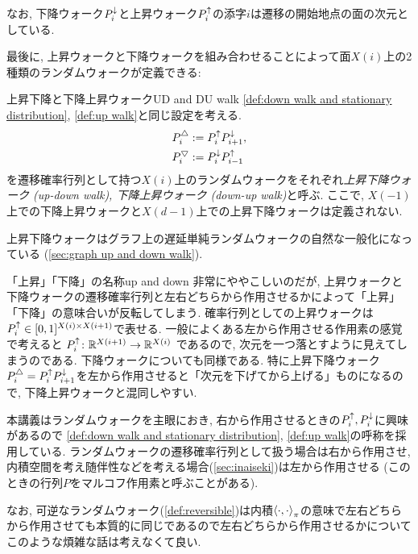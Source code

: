 なお, 下降ウォーク$P^{\downarrow}_{i}$と上昇ウォーク$P^{\uparrow}_i$の添字$i$は遷移の開始地点の面の次元としている.
%

最後に, 上昇ウォークと下降ウォークを組み合わせることによって面$X(i)$上の2種類のランダムウォークが定義できる:
\begin{definition}{上昇下降と下降上昇ウォーク}{UD and DU walk}
    \cref{def:down walk and stationary distribution}, \ref{def:up walk}と同じ設定を考える.
    \begin{align*}
        &P^{\triangle}_i \mathrel{:=}  P^{\uparrow}_i P^{\downarrow}_{i+1},\\
        &P^{\bigtriangledown}_i \mathrel{:=} P^{\downarrow}_{i}P^{\uparrow}_{i-1}
    \end{align*}
    を遷移確率行列として持つ$X(i)$上のランダムウォークをそれぞれ\emph{上昇下降ウォーク (up-down walk), 下降上昇ウォーク (down-up walk)}と呼ぶ.
    ここで, $X(-1)$上での下降上昇ウォークと$X(d-1)$上での上昇下降ウォークは定義されない.
\end{definition}
上昇下降ウォークはグラフ上の遅延単純ランダムウォークの自然な一般化になっている (\cref{sec:graph up and down walk}).

\begin{remark}{「上昇」「下降」の名称}{up and down}
    非常にややこしいのだが,
    上昇ウォークと下降ウォークの遷移確率行列と左右どちらから作用させるかによって「上昇」「下降」の意味合いが反転してしまう.
    確率行列としての上昇ウォークは$P^{\uparrow}_i \in [0,1]^{X(i)\times X(i+1)}$で表せる.
    一般によくある左から作用させる作用素の感覚で考えると
    $P^{\uparrow}_i\colon \mathbb{R}^{X(i+1)} \to \mathbb{R}^{X(i)}$
    であるので, 次元を一つ落とすように見えてしまうのである.
    下降ウォークについても同様である.
    特に上昇下降ウォーク$P^{\triangle}_i=P^{\uparrow}_iP^{\downarrow}_{i+1}$を左から作用させると「次元を下げてから上げる」ものになるので, 下降上昇ウォークと混同しやすい.
    
    本講義はランダムウォークを主眼におき, 右から作用させるときの$P^{\uparrow}_i,P^{\downarrow}_i$に興味があるので
    \cref{def:down walk and stationary distribution}, \ref{def:up walk}の呼称を採用している.
    ランダムウォークの遷移確率行列として扱う場合は右から作用させ, 
    内積空間を考え随伴性などを考える場合(\cref{sec:inaiseki})は左から作用させる (このときの行列$P$をマルコフ作用素と呼ぶことがある).
    
    なお, 可逆なランダムウォーク(\cref{def:reversible})は内積$\left\langle\cdot,\cdot\right\rangle_{\pi}$の意味で左右どちらから作用させても本質的に同じであるので左右どちらから作用させるかについてこのような煩雑な話は考えなくて良い.
\end{remark}

